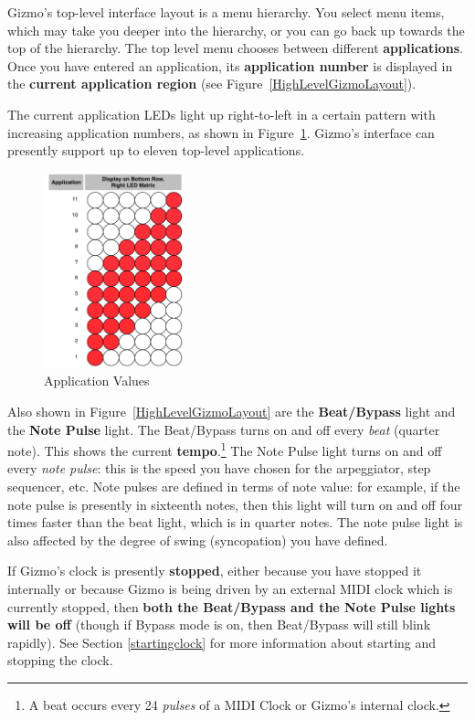 \documentclass{article}
\begin{document}
Gizmo's top-level interface layout is a menu hierarchy.  You select menu items, which may take you deeper into the hierarchy, or you can go back up towards the top of the hierarchy.  The top level menu chooses between different {\bf applications}.  Once you have entered an application, its {\bf application number} is displayed in the {\bf current application region} (see Figure~\ref{HighLevelGizmoLayout}).

The current application LEDs light up right-to-left in a certain pattern with increasing application numbers, as shown in Figure~\ref{applicationvalues}.  Gizmo's interface can presently support up to eleven top-level applications.  

\begin{figure}
\vspace{-3em}\includegraphics[width=1.6in]{Application.pdf}
\vspace{-2em}\caption{\small Application Values}
\vspace{-1em}
\label{applicationvalues}
\end{figure}

Also shown in Figure~\ref{HighLevelGizmoLayout} are the {\bf Beat/Bypass} light and the {\bf Note Pulse} light.  The Beat/Bypass turns on and off every {\it beat} (quarter note).  This shows the current {\bf tempo}.\footnote{A beat occurs every 24 {\it pulses} of a MIDI Clock or Gizmo's internal clock.}  The Note Pulse light turns on and off every {\it note pulse}: this is the speed you have chosen for the arpeggiator, step sequencer, etc.  Note pulses are defined in terms of note value: for example, if the note pulse is presently in sixteenth notes, then this light will turn on and off four times faster than the beat light, which is in quarter notes. The note pulse light is also affected by the degree of swing (syncopation) you have defined.

If Gizmo's clock is presently {\bf stopped}, either because you have stopped it internally or because Gizmo is being driven by an external MIDI clock which is currently stopped, then {\bf both the Beat/Bypass and the Note Pulse lights will be off} (though if Bypass mode is on, then Beat/Bypass will still blink rapidly).  See Section \ref{startingclock} for more information about starting and stopping the clock.
\end{document}
